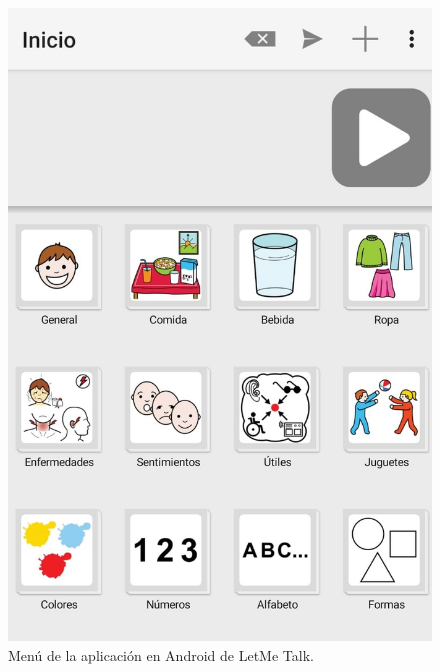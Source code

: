 \begin{figure}[h!]
	\centering
	\includegraphics[width=0.7\linewidth]{Imagenes/Bitmap/LetMeTalk}
	\caption{Menú de la aplicación en Android de LetMe Talk.}
	\label{fig:letmetalk}
\end{figure}

